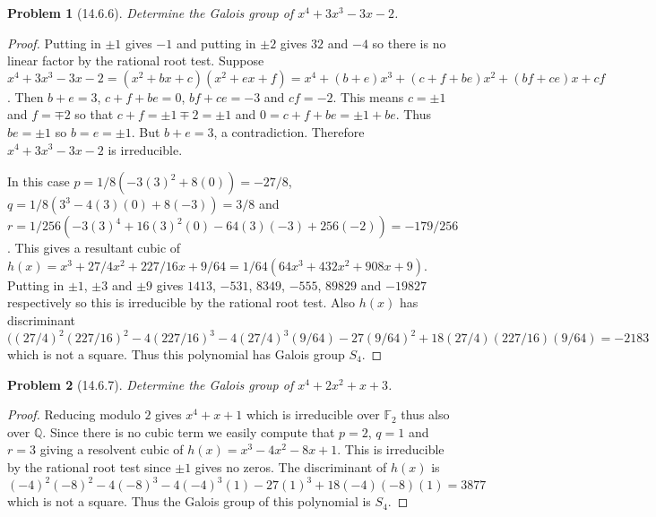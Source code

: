 \documentclass{article}
\newtheorem{problem}{Problem}
\begin{document}
\begin{problem}[14.6.6]
Determine the Galois group of $x^4 + 3x^3 - 3x - 2$.
\end{problem}
\begin{proof}
Putting in $\pm 1$ gives $-1$ and putting in $\pm 2$ gives $32$ and $-4$ so there is no linear factor by the rational root test. Suppose $x^4 + 3x^3 - 3x - 2 = (x^2 + bx + c)(x^2 + ex + f) = x^4 + (b+e)x^3 + (c + f + be)x^2 + (bf+ce)x + cf$. Then $b + e = 3$, $c + f + be = 0$, $bf + ce = -3$ and $cf = -2$. This means $c = \pm 1$ and $f = \mp 2$ so that $c + f = \pm 1 \mp 2 = \pm 1$ and $0 = c + f + be = \pm 1 + be$. Thus $be = \pm 1$ so $b = e = \pm 1$. But $b + e = 3$, a contradiction. Therefore $x^4 + 3x^3 - 3x - 2$ is irreducible.

In this case $p = 1/8(-3(3)^2 + 8(0)) = -27/8$, $q = 1/8(3^3 - 4(3)(0) + 8(-3)) = 3/8$ and $r = 1/256(-3(3)^4 + 16(3)^2(0) - 64(3)(-3) + 256(-2)) = -179/256$. This gives a resultant cubic of $h(x) = x^3 + 27/4 x^2 + 227/16 x + 9/64 = 1/64(64x^3 + 432x^2 + 908x + 9)$. Putting in $\pm 1$, $\pm 3$ and $\pm 9$ gives $1413$, $-531$, $8349$, $-555$, $89829$ and $-19827$ respectively so this is irreducible by the rational root test. Also $h(x)$ has discriminant $((27/4)^2 (227/16)^2 - 4(227/16)^3 - 4(27/4)^3(9/64) - 27(9/64)^2 + 18(27/4)(227/16)(9/64) = -2183$ which is not a square. Thus this polynomial has Galois group $S_4$.
\end{proof}

\begin{problem}[14.6.7]
Determine the Galois group of $x^4 + 2x^2 + x + 3$.
\end{problem}
\begin{proof}
Reducing modulo $2$ gives $x^4 + x + 1$ which is irreducible over $\mathbb{F}_2$ thus also over $\mathbb{Q}$. Since there is no cubic term we easily compute that $p = 2$, $q = 1$ and $r = 3$ giving a resolvent cubic of $h(x) = x^3 - 4x^2 - 8x + 1$. This is irreducible by the rational root test since $\pm 1$ gives no zeros. The discriminant of $h(x)$ is $(-4)^2(-8)^2 - 4(-8)^3 - 4(-4)^3(1) - 27(1)^3 + 18(-4)(-8)(1) = 3877$ which is not a square. Thus the Galois group of this polynomial is $S_4$.
\end{proof}
\end{document}

